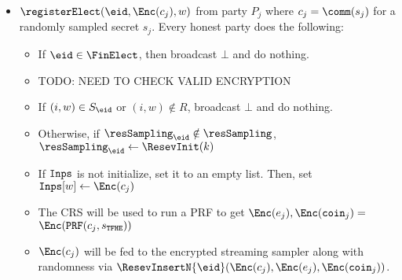 \begin{mdframed}
\begin{itemize}
		\item $\registerElect(\eid, \Enc(c_j), w)$ from party $P_j$ where $c_j = \comm(s_j)$ for a randomly sampled secret $s_j$.
		      Every honest party does the following:
		      \begin{itemize}
			      \item If $\eid \in \FinElect$, then broadcast $\bot$ and do nothing.
			      \item TODO: NEED TO CHECK VALID ENCRYPTION
			      \item If $(i, w) \in S_\eid$ or $(i, w) \notin R$, broadcast $\bot$ and do nothing.
			      \item Otherwise, if $\resSampling_\eid \notin \resSampling$, $\resSampling_\eid \gets \ResevInit(k)$
			      \item If $\texttt{Inps}$ is not initialize, set it to an empty list. Then, set $\inCTList[w] \gets \Enc(c_j)$
			      \item The CRS will be used to run a PRF to get $\Enc(e_j), \Enc(\texttt{coin}_j) =$ \\$\Enc(\texttt{PRF}(c_j, s_\texttt{TFHE}))$
			      \item $\Enc(c_j)$ will be fed to the encrypted streaming sampler along with randomness via
			            $\ResevInsertN{\eid}(\Enc(c_j), \Enc(e_j), \Enc(\texttt{coin}_j))$.
		      \end{itemize}


\end{itemize}
\end{mdframed}
